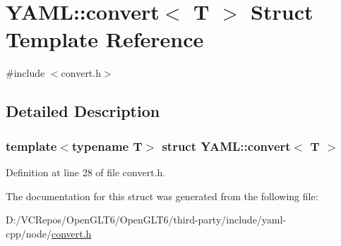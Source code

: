 \hypertarget{struct_y_a_m_l_1_1convert}{}\section{Y\+A\+ML\+::convert$<$ T $>$ Struct Template Reference}
\label{struct_y_a_m_l_1_1convert}


{\ttfamily \#include $<$convert.\+h$>$}



\subsection{Detailed Description}
\subsubsection*{template$<$typename T$>$\newline
struct Y\+A\+M\+L\+::convert$<$ T $>$}



Definition at line 28 of file convert.\+h.



The documentation for this struct was generated from the following file\+:\begin{DoxyCompactItemize}
\item 
D\+:/\+V\+C\+Repos/\+Open\+G\+L\+T6/\+Open\+G\+L\+T6/third-\/party/include/yaml-\/cpp/node/\mbox{\hyperlink{convert_8h}{convert.\+h}}\end{DoxyCompactItemize}
